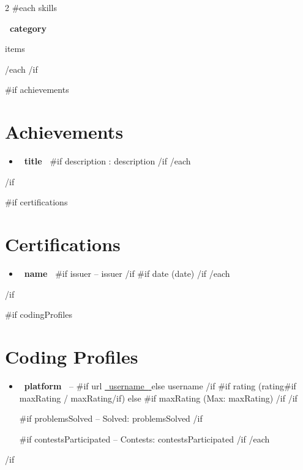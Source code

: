 \documentclass[10pt,a4paper]{article}
\begin{document}
\begin{paracol}{2}
{{#each skills}}

\textbf{ {{~category~}} }\par

{\small {{items}}\par}

\vspace{4pt}

{{/each}}
{{/if}}


{{#if achievements}}
\section{Achievements}

\begin{itemize}
{{#each achievements}}
    \item
    \textbf{ {{~title~}} }
    {{#if description}}
    : {{description}}
    {{/if}}
{{/each}}
\end{itemize}

{{/if}}


{{#if certifications}}
\section{Certifications}

\begin{itemize}
{{#each certifications}}
    \item
    \textbf{ {{~name~}} }
    {{#if issuer}}
    -- {{issuer}}
    {{/if}}
    {{#if date}}
    ({{date}})
    {{/if}}
{{/each}}
\end{itemize}

{{/if}}


{{#if codingProfiles}}
\section{Coding Profiles}

\begin{itemize}
{{#each codingProfiles}}
    \item
    \textbf{ {{~platform~}} } --
    {{#if url}}
    \href{ {{~url~}} }{ {{~username~}} }
    {{else}}
    {{username}}
    {{/if}}
    {{#if rating}}
    ({{rating}}{{#if maxRating}} / {{maxRating}}{{/if}})
    {{else}}
    {{#if maxRating}}
    (Max: {{maxRating}})
    {{/if}}
    {{/if}}

    {{#if problemsSolved}}
    -- Solved: {{problemsSolved}}
    {{/if}}

    {{#if contestsParticipated}}
    -- Contests: {{contestsParticipated}}
    {{/if}}
{{/each}}
\end{itemize}

{{/if}}

\end{paracol}
\end{document}
